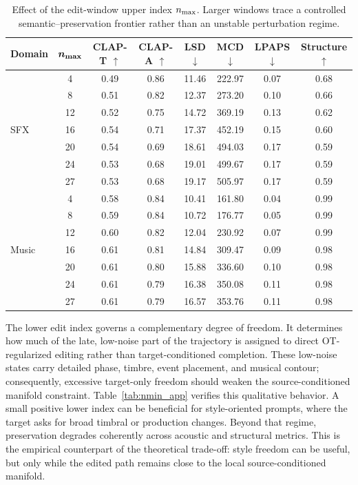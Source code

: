 \begin{table}[htpb]
    \centering
    \small
    \setlength{\tabcolsep}{4.5pt}
    \begin{tabular}{lccccccc}
        \toprule
        \textbf{Domain} & $\boldsymbol{n_{\max}}$ & \textbf{CLAP-T} $\uparrow$ & \textbf{CLAP-A} $\uparrow$ & \textbf{LSD} $\downarrow$ & \textbf{MCD} $\downarrow$ & \textbf{LPAPS} $\downarrow$ & \textbf{Structure} $\uparrow$ \\
        \midrule
        \multirow{7}{*}{SFX} & 4  & 0.49 & 0.86 & 11.46 & 222.97 & 0.07 & 0.68 \\
        & 8  & 0.51 & 0.82 & 12.37 & 273.20 & 0.10 & 0.66 \\
        & 12 & 0.52 & 0.75 & 14.72 & 369.19 & 0.13 & 0.62 \\
        & 16 & 0.54 & 0.71 & 17.37 & 452.19 & 0.15 & 0.60 \\
        & 20 & 0.54 & 0.69 & 18.61 & 494.03 & 0.17 & 0.59 \\
        & 24 & 0.53 & 0.68 & 19.01 & 499.67 & 0.17 & 0.59 \\
        & 27 & 0.53 & 0.68 & 19.17 & 505.97 & 0.17 & 0.59 \\
        \midrule
        \multirow{7}{*}{Music} & 4  & 0.58 & 0.84 & 10.41 & 161.80 & 0.04 & 0.99 \\
        & 8  & 0.59 & 0.84 & 10.72 & 176.77 & 0.05 & 0.99 \\
        & 12 & 0.60 & 0.82 & 12.04 & 230.92 & 0.07 & 0.99 \\
        & 16 & 0.61 & 0.81 & 14.84 & 309.47 & 0.09 & 0.98 \\
        & 20 & 0.61 & 0.80 & 15.88 & 336.60 & 0.10 & 0.98 \\
        & 24 & 0.61 & 0.79 & 16.38 & 350.08 & 0.11 & 0.98 \\
        & 27 & 0.61 & 0.79 & 16.57 & 353.76 & 0.11 & 0.98 \\
        \bottomrule
    \end{tabular}
    \caption{Effect of the edit-window upper index $n_{\max}$. Larger windows trace a controlled semantic--preservation frontier rather than an unstable perturbation regime.}
    \label{tab:nmax_app}
\end{table}

The lower edit index governs a complementary degree of freedom.
It determines how much of the late, low-noise part of the trajectory is assigned to direct OT-regularized editing rather than target-conditioned completion.
These low-noise states carry detailed phase, timbre, event placement, and musical contour; consequently, excessive target-only freedom should weaken the source-conditioned manifold constraint.
Table~\ref{tab:nmin_app} verifies this qualitative behavior.
A small positive lower index can be beneficial for style-oriented prompts, where the target asks for broad timbral or production changes.
Beyond that regime, preservation degrades coherently across acoustic and structural metrics.
This is the empirical counterpart of the theoretical trade-off: style freedom can be useful, but only while the edited path remains close to the local source-conditioned manifold.

